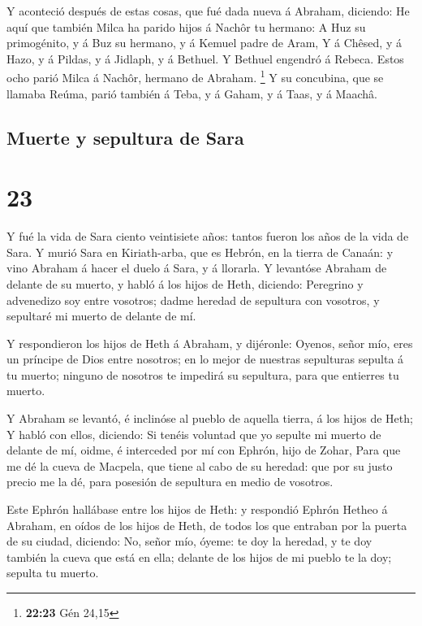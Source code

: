  Y aconteció después de estas cosas, que fué dada nueva á
Abraham, diciendo: He aquí que también Milca ha parido hijos á Nachôr tu
hermano:  A Huz su primogénito, y á Buz su hermano, y á
Kemuel padre de Aram,  Y á Chêsed, y á Hazo, y á Pildas,
y á Jidlaph, y á Bethuel.  Y Bethuel engendró á Rebeca.
Estos ocho parió Milca á Nachôr, hermano de Abraham. \footnote{\textbf{22:23}
  Gén 24,15}  Y su concubina, que se llamaba Reúma, parió
también á Teba, y á Gaham, y á Taas, y á Maachâ.

\hypertarget{muerte-y-sepultura-de-sara}{%
\subsection{Muerte y sepultura de
Sara}\label{muerte-y-sepultura-de-sara}}

\hypertarget{section-22}{%
\section{23}\label{section-22}}

 Y fué la vida de Sara ciento veintisiete años: tantos
fueron los años de la vida de Sara.  Y murió Sara en
Kiriath-arba, que es Hebrón, en la tierra de Canaán: y vino Abraham á
hacer el duelo á Sara, y á llorarla.  Y levantóse Abraham
de delante de su muerto, y habló á los hijos de Heth, diciendo:
 Peregrino y advenedizo soy entre vosotros; dadme heredad
de sepultura con vosotros, y sepultaré mi muerto de delante de mí.

 Y respondieron los hijos de Heth á Abraham, y dijéronle:
 Oyenos, señor mío, eres un príncipe de Dios entre
nosotros; en lo mejor de nuestras sepulturas sepulta á tu muerto;
ninguno de nosotros te impedirá su sepultura, para que entierres tu
muerto.

 Y Abraham se levantó, é inclinóse al pueblo de aquella
tierra, á los hijos de Heth;  Y habló con ellos, diciendo:
Si tenéis voluntad que yo sepulte mi muerto de delante de mí, oidme, é
interceded por mí con Ephrón, hijo de Zohar,  Para que me
dé la cueva de Macpela, que tiene al cabo de su heredad: que por su
justo precio me la dé, para posesión de sepultura en medio de vosotros.

 Este Ephrón hallábase entre los hijos de Heth: y
respondió Ephrón Hetheo á Abraham, en oídos de los hijos de Heth, de
todos los que entraban por la puerta de su ciudad, diciendo:
 No, señor mío, óyeme: te doy la heredad, y te doy
también la cueva que está en ella; delante de los hijos de mi pueblo te
la doy; sepulta tu muerto.

